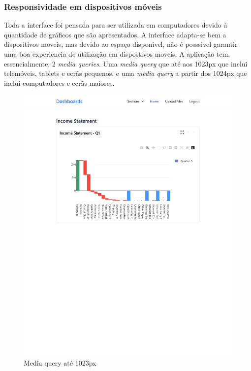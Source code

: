 \subsubsection{Responsividade em dispositivos móveis}

Toda a interface foi pensada para ser utilizada em computadores devido à quantidade de gráficos que são apresentados. A interface adapta-se bem a dispositivos moveis, mas devido ao espaço disponivel, não é posssivel garantir uma boa experiencia de utilização em dispostivos moveis. A aplicação tem, essencialmente, 2 \textit{media queries}. Uma \textit{media query} que até aos 1023px que inclui telemóveis, tablets e ecrãs pequenos, e uma \textit{media query} a partir dos 1024px que inclui computadores e ecrãs maiores.

\begin{figure}[H]
    \centering
    \includegraphics[width=\textwidth]{./img/res_1023}
 \caption{Media query até 1023px}
\end{figure}



